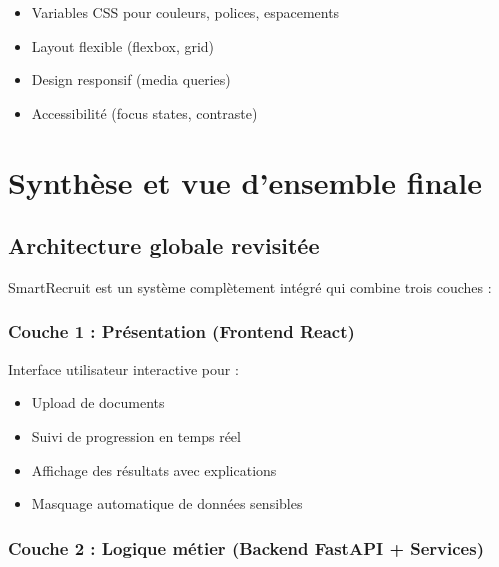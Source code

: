 \documentclass[12pt,a4paper,oneside]{book}
\begin{document}
\begin{itemize}
    \item Variables CSS pour couleurs, polices, espacements
    \item Layout flexible (flexbox, grid)
    \item Design responsif (media queries)
    \item Accessibilité (focus states, contraste)
\end{itemize}

\newpage


\chapter{Synthèse et vue d'ensemble finale}

\section{Architecture globale revisitée}

SmartRecruit est un système complètement intégré qui combine trois couches :

\subsection{Couche 1 : Présentation (Frontend React)}

Interface utilisateur interactive pour :
\begin{itemize}
    \item Upload de documents
    \item Suivi de progression en temps réel
    \item Affichage des résultats avec explications
    \item Masquage automatique de données sensibles
\end{itemize}

\subsection{Couche 2 : Logique métier (Backend FastAPI + Services)}
\end{document}
